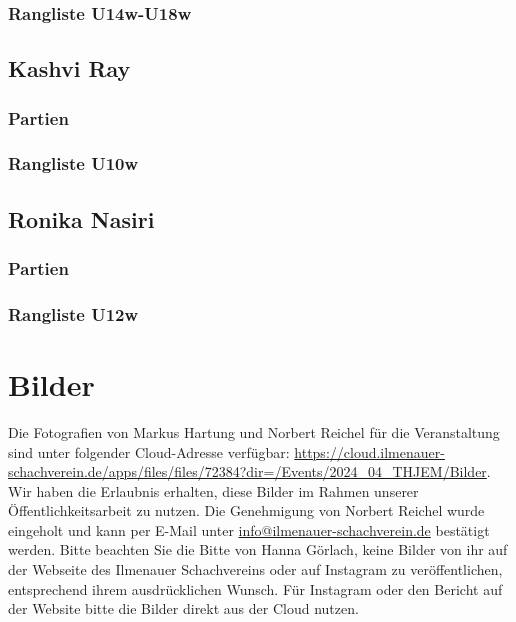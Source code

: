 \documentclass[a4paper,ngerman]{tui-algo-seminar}
\begin{document}
    \subsubsection{Rangliste U14w-U18w}
        
\clearpage

\subsection{Kashvi Ray}
    \subsubsection{Partien}
        
    \subsubsection{Rangliste U10w}
        
\clearpage

\subsection{Ronika Nasiri}
    \subsubsection{Partien}
        
    \subsubsection{Rangliste U12w}
        
    
\clearpage


\section{Bilder}
Die Fotografien von Markus Hartung und Norbert Reichel für die Veranstaltung sind unter folgender Cloud-Adresse verfügbar: \url{https://cloud.ilmenauer-schachverein.de/apps/files/files/72384?dir=/Events/2024_04_THJEM/Bilder}. Wir haben die Erlaubnis erhalten, diese Bilder im Rahmen unserer Öffentlichkeitsarbeit zu nutzen. Die Genehmigung von Norbert Reichel wurde eingeholt und kann per E-Mail unter \href{mailto:info@ilmenauer-schachverein.de}{info@ilmenauer-schachverein.de} bestätigt werden.
Bitte beachten Sie die Bitte von Hanna Görlach, keine Bilder von ihr auf der Webseite des Ilmenauer Schachvereins oder auf Instagram zu veröffentlichen, entsprechend ihrem ausdrücklichen Wunsch. Für Instagram oder den Bericht auf der Website bitte die Bilder direkt aus der Cloud nutzen.

\end{document}
